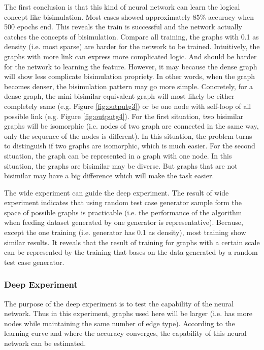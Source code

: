 The first conclusion is that this kind of neural network can learn the logical concept like bisimulation.
Most cases showed approximately 85\% accuracy when 500 epochs end.
This reveals the train is successful and the network actually catches the concepts of bisimulation.
Compare all training, the graphs with 0.1 as density (i.e. most sparse) are harder for the network to be trained.
Intuitively, the graphs with more link can express more complicated logic.
And should be harder for the network to learning the feature.
However, it may because the dense graph will show less complicate bisimulation propriety.
In other words, when the graph becomes denser, the bisimulation pattern may go more simple.
Concretely, for a dense graph, the mini bisimilar equivalent graph will most likely be either completely same (e.g. Figure \ref{fig:outputg3}) or be one node with self-loop of all possible link (e.g. Figure \ref{fig:outputg4}).
For the first situation, two bisimilar graphs will be isomorphic (i.e. nodes of two graph are connected in the same way, only the sequence of the nodes is different).
In this situation, the problem turns to distinguish if two graphs are isomorphic, which is much easier.
For the second situation, the graph can be represented in a graph with one node.
In this situation, the graphs are bisimilar may be diverse.
But graphs that are not bisimilar may have a big difference which will make the task easier.

The wide experiment can guide the deep experiment.
The result of wide experiment indicates that using random test case generator sample form the space of possible graphs is practicable (i.e. the performance of the algorithm when feeding dataset generated by one generator is representative).
Because, except the one training (i.e. generator has 0.1 as density), most training show similar results.
It reveals that the result of training for graphs with a certain scale can be represented by the training that bases on the data generated by a random test case generator.

\subsubsection*{Deep Experiment}
The purpose of the deep experiment is to test the capability of the neural network.
Thus in this experiment, graphs used here will be larger (i.e. has more nodes while maintaining the same number of edge type).
According to the learning curve and where the accuracy converges, the capability of this neural network can be estimated.

